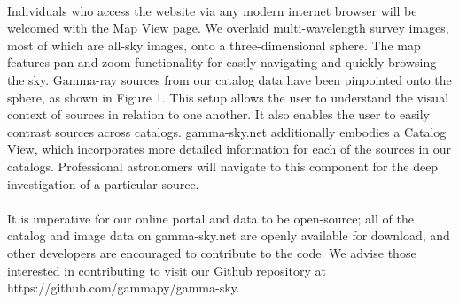 \paragraph{}    Individuals who access the website via any modern internet browser will be welcomed with the Map View page.
    We overlaid multi-wavelength survey images, most of which are all-sky images, onto a three-dimensional sphere.
    The map features pan-and-zoom functionality for easily navigating and quickly browsing the sky. Gamma-ray sources from
    our catalog data have been pinpointed onto the sphere, as shown in Figure 1. This setup allows the user to understand
    the visual context of sources in relation to one another. It also enables the user to easily contrast sources across catalogs.
    gamma-sky.net additionally embodies a Catalog View, which incorporates more detailed information for each of the sources in our catalogs.
    Professional astronomers will navigate to this component for the deep investigation of a particular source. \par

\paragraph{}    It is imperative for our online portal and data to be open-source; all of the catalog and image data on gamma-sky.net are
    openly available for download, and other developers are encouraged to contribute to the code. We advise those interested
    in contributing to visit our Github repository at https://github.com/gammapy/gamma-sky. \par 
